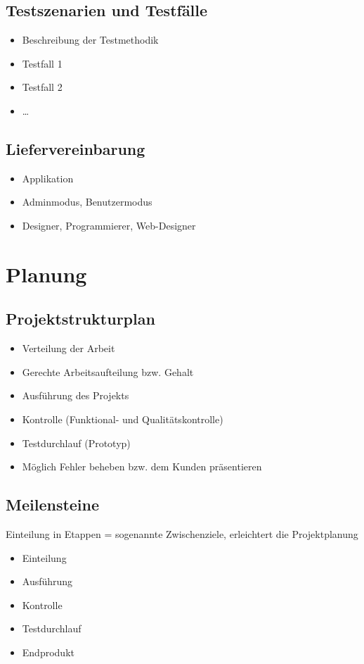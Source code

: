 \subsection{Testszenarien und Testfälle}
\begin{itemize}
	\item Beschreibung der Testmethodik
	\item Testfall 1
	\item Testfall 2
	\item \ldots
\end{itemize}
\subsection{Liefervereinbarung}
\begin{itemize}
	\item Applikation
	\item Adminmodus, Benutzermodus
	\item Designer, Programmierer, Web-Designer
\end{itemize}
\section{Planung}
\subsection{Projektstrukturplan}


\begin{itemize}
	\item Verteilung der Arbeit
	\item Gerechte Arbeitsaufteilung bzw. Gehalt
	\item Ausführung des Projekts
	\item Kontrolle (Funktional- und Qualitätskontrolle)
	\item Testdurchlauf (Prototyp)
	\item Möglich Fehler beheben bzw. dem Kunden präsentieren
\end{itemize}

\subsection{Meilensteine}
Einteilung in Etappen = sogenannte Zwischenziele, erleichtert die Projektplanung


\begin{itemize}
	\item Einteilung
	\item Ausführung
	\item Kontrolle
	\item Testdurchlauf
	\item Endprodukt
\end{itemize}




